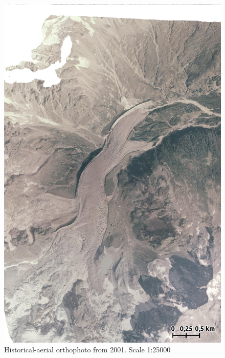\begin{figure}[p]
    \centering
    \includegraphics[width=\textwidth]{figures/appendix/orto_2001.jpg}
    \caption{Historical-aerial orthophoto from 2001. Scale 1:25000}
\end{figure}


